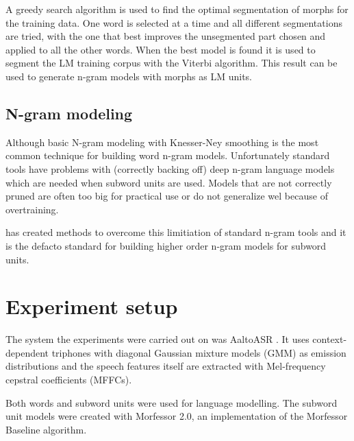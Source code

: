 \documentclass[b5paper]{article}
\newcommand{\note}[1]{{\textcolor{blue}{#1}}}
\begin{document}
A greedy search algorithm is used to find the optimal segmentation of morphs for the training data. One word is selected at a time and all different segmentations are tried, with the one that best improves the unsegmented part chosen and applied to all the other words. When the best model is found it is used to segment the LM training corpus with the Viterbi algorithm. This result can be used to generate n-gram models with morphs as LM units.



\subsection{N-gram modeling}
Although basic N-gram modeling with Knesser-Ney smoothing \cite{chen1996empirical} is the most common technique for building word n-gram models. Unfortunately standard tools have problems with (correctly backing off) deep n-gram language models which are needed when subword units are used. Models that are not correctly pruned are often too big for practical use or do not generalize wel because of overtraining.

\cite{siivola2007growing} has created methods to overcome this limitiation of standard n-gram tools and it is the defacto standard for building higher order n-gram models for subword units.



\section{Experiment setup}



The system the experiments were carried out on was AaltoASR \cite{hirsimaki2009importance}\cite{pylkkonen2005efficient}. It uses context-dependent triphones with diagonal Gaussian mixture models (GMM) as emission distributions and the speech features itself are extracted with Mel-frequency cepstral coefficients (MFFCs). 

Both words and subword units were used for language modelling. The subword unit models were created with Morfessor 2.0, an implementation of the Morfessor Baseline algorithm\cite{virpioja2013morfessor}. 
\end{document}
